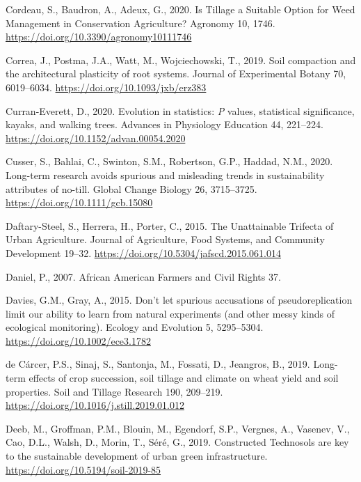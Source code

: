 \documentclass[
  12pt,
]{article}
\newlength{\cslhangindent}
\newlength{\cslentryspacingunit} %
\newenvironment{CSLReferences}[2] %
 {%
  \setlength{\parindent}{0pt}
  \ifodd #1
  \let\oldpar\par
  \def\par{\hangindent=\cslhangindent\oldpar}
  \fi
  \setlength{\parskip}{#2\cslentryspacingunit}
 }%
 {}
\begin{document}
\begin{CSLReferences}{1}{0}
\leavevmode{}%
Cordeau, S., Baudron, A., Adeux, G., 2020. Is {Tillage} a {Suitable Option} for {Weed Management} in {Conservation Agriculture}? Agronomy 10, 1746. \url{https://doi.org/10.3390/agronomy10111746}

\leavevmode{}%
Correa, J., Postma, J.A., Watt, M., Wojciechowski, T., 2019. Soil compaction and the architectural plasticity of root systems. Journal of Experimental Botany 70, 6019--6034. \url{https://doi.org/10.1093/jxb/erz383}

\leavevmode{}%
Curran-Everett, D., 2020. Evolution in statistics: {\emph{P}} values, statistical significance, kayaks, and walking trees. Advances in Physiology Education 44, 221--224. \url{https://doi.org/10.1152/advan.00054.2020}

\leavevmode{}%
Cusser, S., Bahlai, C., Swinton, S.M., Robertson, G.P., Haddad, N.M., 2020. Long-term research avoids spurious and misleading trends in sustainability attributes of no-till. Global Change Biology 26, 3715--3725. \url{https://doi.org/10.1111/gcb.15080}

\leavevmode{}%
Daftary-Steel, S., Herrera, H., Porter, C., 2015. The {Unattainable Trifecta} of {Urban Agriculture}. Journal of Agriculture, Food Systems, and Community Development 19--32. \url{https://doi.org/10.5304/jafscd.2015.061.014}

\leavevmode{}%
Daniel, P., 2007. African {American Farmers} and {Civil Rights} 37.

\leavevmode{}%
Davies, G.M., Gray, A., 2015. Don't let spurious accusations of pseudoreplication limit our ability to learn from natural experiments (and other messy kinds of ecological monitoring). Ecology and Evolution 5, 5295--5304. \url{https://doi.org/10.1002/ece3.1782}

\leavevmode{}%
de Cárcer, P.S., Sinaj, S., Santonja, M., Fossati, D., Jeangros, B., 2019. Long-term effects of crop succession, soil tillage and climate on wheat yield and soil properties. Soil and Tillage Research 190, 209--219. \url{https://doi.org/10.1016/j.still.2019.01.012}

\leavevmode{}%
Deeb, M., Groffman, P.M., Blouin, M., Egendorf, S.P., Vergnes, A., Vasenev, V., Cao, D.L., Walsh, D., Morin, T., Séré, G., 2019. Constructed {Technosols} are key to the sustainable development of urban green infrastructure. \url{https://doi.org/10.5194/soil-2019-85}


\end{CSLReferences}
\end{document}
